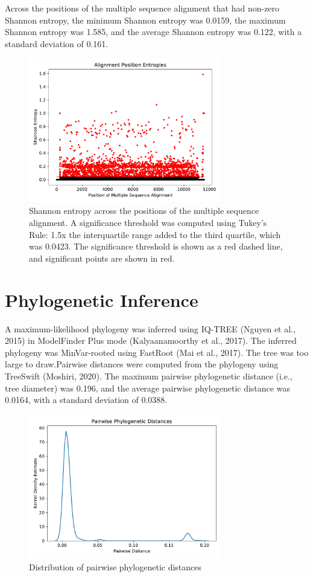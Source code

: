 \documentclass{article}
\begin{document}
 Across the positions of the multiple sequence alignment that had non-zero Shannon entropy, the minimum Shannon entropy was 0.0159, the maximum Shannon entropy was 1.585, and the average Shannon entropy was 0.122, with a standard deviation of 0.161.

\begin{figure}[h]
\centering
\includegraphics[width=0.75\textwidth,keepaspectratio]{./figs/alignment_entropies.pdf}
\caption{Shannon entropy across the positions of the multiple sequence alignment. A significance threshold was computed using Tukey's Rule: 1.5x the interquartile range added to the third quartile, which was 0.0423. The significance threshold is shown as a red dashed line, and significant points are shown in red.}
\end{figure}

\section{Phylogenetic Inference}
A maximum-likelihood phylogeny was inferred using IQ-TREE (Nguyen et al., 2015) in ModelFinder Plus mode (Kalyaanamoorthy et al., 2017). The inferred phylogeny was MinVar-rooted using FastRoot (Mai et al., 2017). The tree was too large to draw.Pairwise distances were computed from the phylogeny using TreeSwift (Moshiri, 2020). The maximum pairwise phylogenetic distance (i.e., tree diameter) was 0.196, and the average pairwise phylogenetic distance was 0.0164, with a standard deviation of 0.0388.

\begin{figure}[h]
\centering
\includegraphics[width=0.75\textwidth,keepaspectratio]{./figs/pairwise_distances_tree.pdf}
\caption{Distribution of pairwise phylogenetic distances}
\end{figure}
\end{document}
